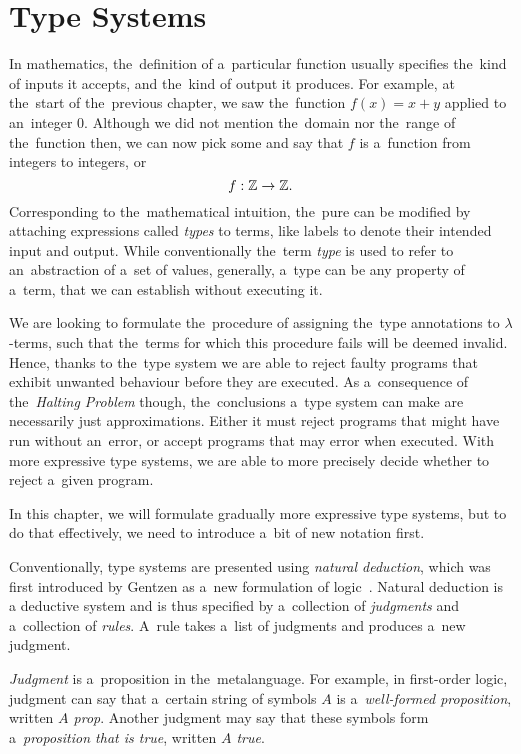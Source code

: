 \chapter{Type Systems}\label{cha:typesystems}

In mathematics, the~definition of a~particular function usually specifies
the~kind of inputs it accepts, and the~kind of output it produces. For example,
at the~start of the~previous chapter, we saw the~function $f(x) = x + y$ applied
to an~integer 0. Although we did not mention the~domain nor the~range of
the~function then, we can now pick some and say that $f$ is a~function from
integers to integers, or
\[
  f: \mathbb{Z} \to \mathbb{Z}.
\]
Corresponding to the~mathematical intuition, the~pure \lc can be modified by
attaching expressions called \emph{types} to terms, like labels to denote their
intended input and output. While conventionally the~term \emph{type} is used to
refer to an~abstraction of a~set of values, generally, a~type can be any
property of a~term, that we can establish without executing it.

We are looking to formulate the~procedure of assigning the~type annotations to
$\lambda$-terms, such that the~terms for which this procedure fails will be
deemed invalid. Hence, thanks to the~type system we are able to reject faulty
programs that exhibit unwanted behaviour before they are executed.
As a~consequence of the~\emph{Halting Problem} though, the~conclusions a~type
system can make are necessarily just approximations. Either it must reject
programs that might have run without an~error, or accept programs that may error
when executed. With more expressive type systems, we are able to more precisely
decide whether to reject a~given program.

In this chapter, we will formulate gradually more expressive type systems,
but to do that effectively, we need to introduce a~bit of new notation first.

\label{sec:natural_deduction}

Conventionally, type systems are presented using \emph{natural deduction}, which
was first introduced by Gentzen as a~new formulation of
logic~\cite{gentzen_1935}. Natural deduction is a deductive system and is thus
specified by a~collection of \emph{judgments} and a~collection of \emph{rules}.
A~rule takes a~list of judgments and produces a~new judgment.

\emph{Judgment} is a~proposition in the~metalanguage. For example, in
first-order logic, judgment can say that a~certain string of symbols $A$ is
a~\emph{well-formed proposition}, written \emph{$A$ prop}. Another judgment may
say that these symbols form a~\emph{proposition that is true}, written
\emph{$A$ true}.

